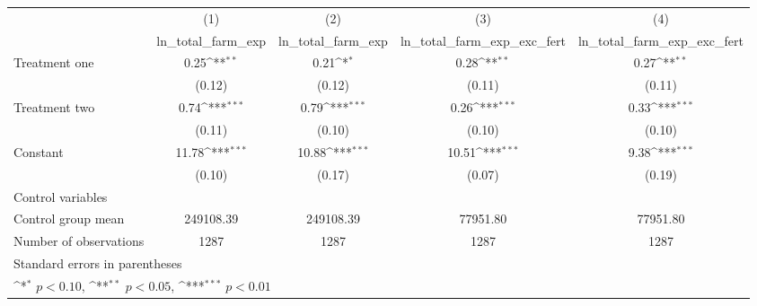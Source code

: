 {
\def\sym#1{\ifmmode^{#1}\else\(^{#1}\)\fi}
\begin{tabular}{l*{4}{c}}
\hline\hline
                    &\multicolumn{1}{c}{(1)}&\multicolumn{1}{c}{(2)}&\multicolumn{1}{c}{(3)}&\multicolumn{1}{c}{(4)}\\
                    &\multicolumn{1}{c}{ln\_total\_farm\_exp}&\multicolumn{1}{c}{ln\_total\_farm\_exp}&\multicolumn{1}{c}{ln\_total\_farm\_exp\_exc\_fert}&\multicolumn{1}{c}{ln\_total\_farm\_exp\_exc\_fert}\\
\hline
Treatment one       &        0.25\sym{**} &        0.21\sym{*}  &        0.28\sym{**} &        0.27\sym{**} \\
                    &      (0.12)         &      (0.12)         &      (0.11)         &      (0.11)         \\
[1em]
Treatment two       &        0.74\sym{***}&        0.79\sym{***}&        0.26\sym{***}&        0.33\sym{***}\\
                    &      (0.11)         &      (0.10)         &      (0.10)         &      (0.10)         \\
[1em]
Constant            &       11.78\sym{***}&       10.88\sym{***}&       10.51\sym{***}&        9.38\sym{***}\\
                    &      (0.10)         &      (0.17)         &      (0.07)         &      (0.19)         \\
\hline
Control variables   &                     &                     &                     &                     \\
Control group mean  &   249108.39         &   249108.39         &    77951.80         &    77951.80         \\
Number of observations&        1287         &        1287         &        1287         &        1287         \\
\hline\hline
\multicolumn{5}{l}{\footnotesize Standard errors in parentheses}\\
\multicolumn{5}{l}{\footnotesize \sym{*} \(p<0.10\), \sym{**} \(p<0.05\), \sym{***} \(p<0.01\)}\\
\end{tabular}
}
